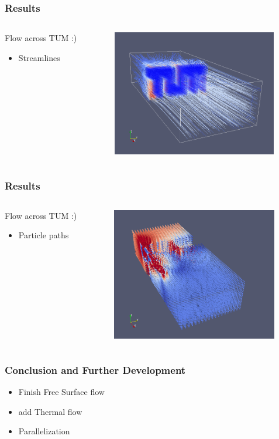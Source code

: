 \documentclass{beamer}
\begin{document}
\begin{frame}
\frametitle{Results}
\begin{columns}
\begin{column}{0.33\textwidth}
Flow across TUM :)
\begin{itemize}
\item Streamlines
\end{itemize}
\end{column}
\begin{column}{0.66\textwidth}
\includegraphics[height=5.5cm]{TUMFlow.png}
\end{column}
\end{columns}
\end{frame}

\begin{frame}
\frametitle{Results}
\begin{columns}
\begin{column}{0.33\textwidth}
Flow across TUM :)
\begin{itemize}
\item Particle paths
\end{itemize}
\end{column}
\begin{column}{0.66\textwidth}
\includegraphics[height=5.8cm]{TUM-Particles.png}
\end{column}
\end{columns}
\end{frame}

\begin{frame}
\frametitle{Conclusion and Further Development}
\begin{itemize}
\item Finish Free Surface flow
\item add Thermal flow
\item Parallelization
\end{itemize}
\end{frame}
\end{document}

